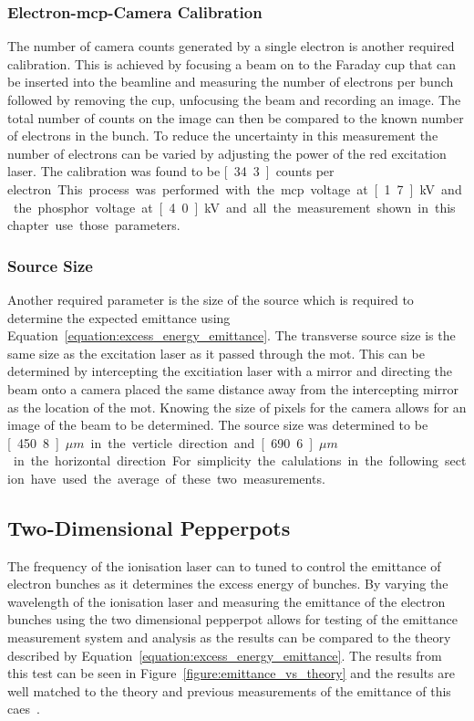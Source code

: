 \subsubsection{Electron-\gls{mcp}-Camera Calibration}
The number of camera counts generated by a single electron is another required calibration.
This is achieved by focusing a beam on to the Faraday cup that can be inserted into the beamline and measuring the number of electrons per bunch followed by removing the cup, unfocusing the beam and recording an image.
The total number of counts on the image can then be compared to the known number of electrons in the bunch.
To reduce the uncertainty in this measurement the number of electrons can be varied by adjusting the power of the red excitation laser.
The calibration was found to be \unit[34.3]{counts per electron}.

This process was performed with the \gls{mcp} voltage at \unit[1.7]{kV} and the phosphor voltage at \unit[4.0]{kV} and all the measurement shown in this chapter use those parameters.

\subsubsection{Source Size}
Another required parameter is the size of the source which is required to determine the expected emittance using Equation~\ref{equation:excess_energy_emittance}.
The transverse source size is the same size as the excitation laser as it passed through the \gls{mot}.
This can be determined by intercepting the excitiation laser with a mirror and directing the beam onto a camera placed the same distance away from the intercepting mirror as the location of the \gls{mot}.
Knowing the size of pixels for the camera allows for an image of the beam to be determined.
The source size was determined to be \unit[450.8]{$\mu m$} in the verticle direction and \unit[690.6]{$\mu m$} in the horizontal direction.
For simplicity the calulations in the following section have used the average of these two measurements.

\subsection{Two-Dimensional Pepperpots}
The frequency of the ionisation laser can to tuned to control the emittance of electron bunches as it determines the excess energy of bunches.
By varying the wavelength of the ionisation laser and measuring the emittance of the electron bunches using the two dimensional pepperpot allows for testing of the emittance measurement system and analysis as the results can be compared to the theory described by Equation~\ref{equation:excess_energy_emittance}.
The results from this test can be seen in Figure~\ref{figure:emittance_vs_theory} and the results are well matched to the theory and previous measurements of the emittance of this \gls{caes}~\cite{mcculloch_high-coherence_2013}.

